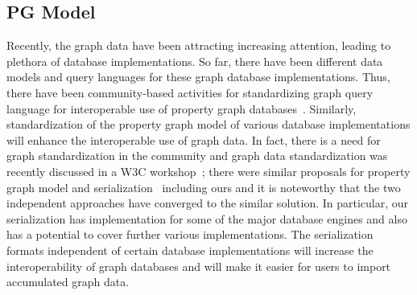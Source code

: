 \documentclass[runningheads]{llncs}
\begin{document}
\subsection{PG Model}
Recently, the graph data have been attracting increasing attention, leading to plethora of database implementations. 
So far, there have been different data models and query languages for these graph database implementations.
Thus, there have been community-based activities for standardizing graph query language for interoperable use of property graph databases~\cite{angles3}. Similarly, standardization of the property graph model of various database implementations will enhance the interoperable use of graph data. In fact, there is a need for graph standardization in the community and graph data standardization was recently discussed in a W3C workshop~\cite{w3c}; there were similar proposals for property graph model and serialization~\cite{tomaszuk} including ours and it is noteworthy that the two independent approaches have converged to the similar solution. 
In particular, our serialization has implementation for some of the major database engines and also has a potential to cover further various implementations. %
The serialization formats independent of certain database implementations will increase the interoperability of graph databases and will make it easier for users to import accumulated graph data.
\end{document}
